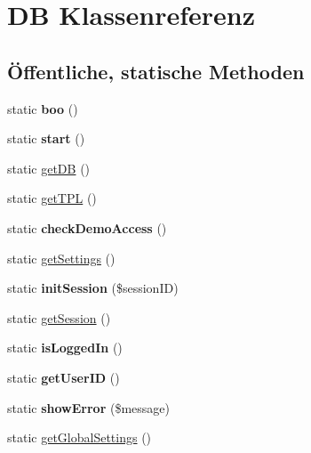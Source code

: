 \hypertarget{class_d_b}{}\section{DB Klassenreferenz}
\label{class_d_b}
\subsection*{Öffentliche, statische Methoden}
\begin{DoxyCompactItemize}
\item 
\mbox{\label{class_d_b_a788af33649fa83ab48cdd338a6ac82a1}} 
static {\bfseries boo} ()
\item 
\mbox{\label{class_d_b_a0f39e95bacedeea629be8e6737a5e022}} 
static {\bfseries start} ()
\item 
static \mbox{\hyperlink{class_d_b_a1f39c0489afad64328534850308fc9a9}{get\+DB}} ()
\item 
static \mbox{\hyperlink{class_d_b_a3b3f4c52a74bd43c8de64f37affdc13c}{get\+T\+PL}} ()
\item 
\mbox{\label{class_d_b_aca12a38d8e785db05d7944b2a42027ab}} 
static {\bfseries check\+Demo\+Access} ()
\item 
static \mbox{\hyperlink{class_d_b_a30c984e1dee257f1b9d3b62cbae0ac41}{get\+Settings}} ()
\item 
\mbox{\label{class_d_b_a0c612ee70c41c4ffaad4c079bc5b29fd}} 
static {\bfseries init\+Session} (\$session\+ID)
\item 
static \mbox{\hyperlink{class_d_b_a59bd612b741f468f0e14531e05a33892}{get\+Session}} ()
\item 
\mbox{\label{class_d_b_ad378571f7601f6c40a1c38bbfb6e2e2b}} 
static {\bfseries is\+Logged\+In} ()
\item 
\mbox{\label{class_d_b_a1fd9a2753061e0e61074560f22732561}} 
static {\bfseries get\+User\+ID} ()
\item 
\mbox{\label{class_d_b_af00a06661451a0bb653f0aaede785e8b}} 
static {\bfseries show\+Error} (\$message)
\item 
static \mbox{\hyperlink{class_d_b_a0eb830294949a623b79351601949a673}{get\+Global\+Settings}} ()

\end{DoxyCompactItemize}
